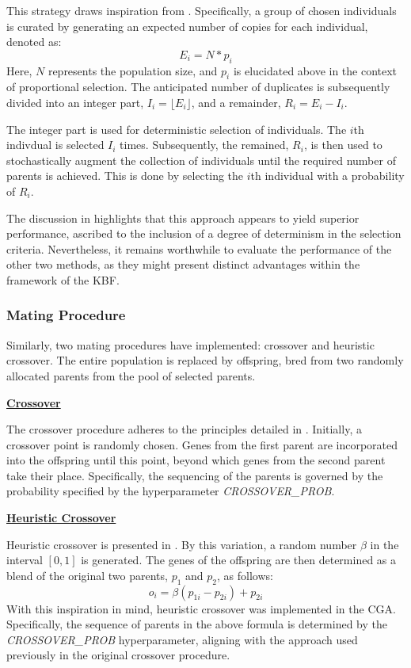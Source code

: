 \documentclass[10pt]{article}
\begin{document}
\begin{multicols}{2}
This strategy draws inspiration from \cite{parks2023geneticalgorithms}. Specifically, a group of chosen individuals is curated by generating an expected number of copies for each individual, denoted as: 
\[E_i = N * p_i\]
Here, \(N\) represents the population size, and \(p_i\) is elucidated above in the context of proportional selection. The anticipated number of duplicates is subsequently divided into an integer part, \(I_i = \lfloor E_i \rfloor\), and a remainder, \(R_i = E_i - I_i\). 

The integer part is used for deterministic selection of individuals. The $i$th indivdual is selected $I_i$ times. Subsequently, the remained, $R_i$, is then used to stochastically augment the collection of individuals until the required number of parents is achieved. This is done by selecting the $i$th individual with a probability of $R_i$.

The discussion in \cite{parks2023geneticalgorithms} highlights that this approach appears to yield superior performance, ascribed to the inclusion of a degree of determinism in the selection criteria. Nevertheless, it remains worthwhile to evaluate the performance of the other two methods, as they might present distinct advantages within the framework of the KBF.

\subsubsection{Mating Procedure}

Similarly, two mating procedures have implemented: crossover and heuristic crossover. The entire population is replaced by offspring, bred from two randomly allocated parents from the pool of selected parents.

\textbf{\underline{Crossover}}

The crossover procedure adheres to the principles detailed in \cite{parks2023geneticalgorithms}. Initially, a crossover point is randomly chosen. Genes from the first parent are incorporated into the offspring until this point, beyond which genes from the second parent take their place. Specifically, the sequencing of the parents is governed by the probability specified by the hyperparameter \textit{CROSSOVER\_PROB}.

\textbf{\underline{Heuristic Crossover}}

Heuristic crossover is presented in \cite{Michalewicz_2011}. By this variation, a random number $\beta$ in the interval $[0, 1]$ is generated. The genes of the offspring are then determined as a blend of the original two parents, $p_1$ and $p_2$, as follows:
\[
    o_i = \beta (p_{1i} - p_{2i}) + p_{2i}
\]
With this inspiration in mind, heuristic crossover was implemented in the CGA. Specifically, the sequence of parents in the above formula is determined by the \textit{CROSSOVER\_PROB} hyperparameter, aligning with the approach used previously in the original crossover procedure.


\end{multicols}
\end{document}
